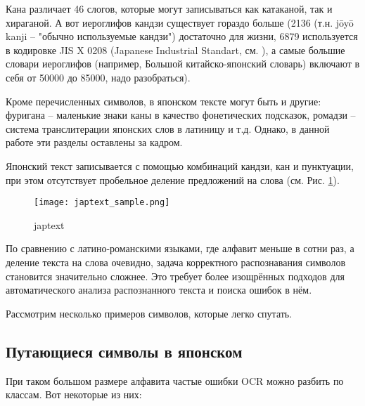 Кана различает 46 слогов, которые могут записываться как катаканой, так и хираганой. А вот иероглифов кандзи существует гораздо больше (2136 (т.н. jōyō kanji -- "обычно используемые кандзи") достаточно для жизни, 6879 используется в кодировке JIS X 0208 (Japanese Industrial Standart, см. \cite{JISX0208}), а самые большие словари иероглифов (например, Большой китайско-японский словарь) включают в себя от 50000 до 85000, надо разобраться).

Кроме перечисленных символов, в японском тексте могут быть и другие: фуригана -- маленькие знаки каны в качество фонетических подсказок, ромадзи -- система транслитерации японских слов в латиницу и т.д. Однако, в данной работе эти разделы оставлены за кадром.

Японский текст записывается с помощью комбинаций кандзи, кан и пунктуации, при этом отсутствует пробельное деление предложений на слова (см. Рис. \cref{fig:japtext_sample}).
	\begin{figure}[H]
	\centering
	\texttt{[image: japtext\_sample.png]}
	\caption{japtext}
	\label{fig:japtext_sample}
\end{figure}

По сравнению с латино-романскими языками, где алфавит меньше в сотни раз, а деление текста на слова очевидно, задача корректного распознавания символов становится значительно сложнее. Это требует более изощрённых подходов для автоматического анализа распознанного текста и поиска ошибок в нём.

Рассмотрим несколько примеров символов, которые легко спутать.

\subsection{ Путающиеся символы в японском }

При таком большом размере алфавита частые ошибки OCR можно разбить по классам. Вот некоторые из них:

